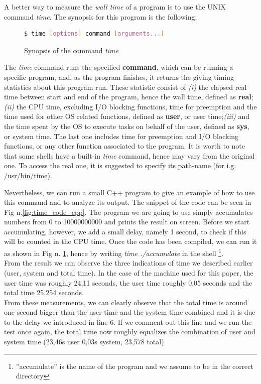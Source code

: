 A better way to measure the \textit{wall time} of a program is to use the UNIX command \textit{time}. The synopsis for this program is the following: \cite{linux_commands}\\
\begin{figure}[h]
\begin{lstlisting}[language=bash]
   $ time [options] command [arguments...]
\end{lstlisting}
\caption{Synopsis of the command \textit{time}}
\label{fig:time_code}
\end{figure}
The \textit{time} command runs the specified \textbf{command}, which can be running a specific program, and, as the program finishes, it returns the giving timing statistics about this program run.
These statistic consist of \textit{(i)} the elapsed real time between start and end of the program, hence the wall time, defined as \textbf{real}; \textit{(ii)} the CPU time, excluding I/O blocking functions, time for preemption and the time used for other OS related functions, defined as \textbf{user}, or user time;\textit{(iii)} and the time spent by the OS to execute tasks on behalf of the user, defined as \textbf{sys}, or system time. The last one includes time for preemption and I/O blocking functions, or any other function associated to the program. \cite{Stewart2001MeasuringET}
It is worth to note that some shells have a built-in \textit{time} command, hence may vary from the original one. To access the real one, it is suggested to specify its path-name (for i.g. /usr/bin/time).\cite{linux_commands} 

Nevertheless, we can run a small C++ program to give an example of how to use this command and to analyze its output. The snippet of the code can be seen in Fig n.\ref{fig:time_code_cpp}. The program we are going to use simply accumulates numbers from 0  to 10000000000 and prints the result on screen. Before we start accumulating, however, we add a small delay, namely 1 second, to check if this will be counted in the CPU time. Once the code has been compiled, we can run it as shown in Fig n. \ref{fig:time_code}, hence by writing \textit{time ./accumulate} in the shell \footnote{''accumulate'' is the name of the program and we assume to be in the correct directory}.\\
From the result we can observe the three indications of time we described earlier (user, system and total time).  In the case of the machine used for this paper, the user time was roughly 24,11 seconds, the user time roughly 0,05 seconds and the total time 25,254 seconds. \\
From these measurements, we can clearly observe that the total time is around one second bigger than the user time and the system time combined and it is due to the delay we introduced in line 6. If we comment out this line and we run the test once again, the total time now roughly equalizes the combination of user and system time (23,46s user 0,03s system, 23,578 total)


